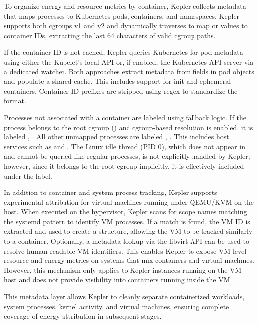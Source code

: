 To organize energy and resource metrics by container, Kepler collects metadata that maps processes to Kubernetes pods, containers, and namespaces. Kepler supports both cgroups v1 and v2 and dynamically traverses  to map  or  values to container IDs, extracting the last 64 characters of valid cgroup paths.

If the container ID is not cached, Kepler queries Kubernetes for pod metadata using either the Kubelet's local  API or, if enabled, the Kubernetes API server via a dedicated watcher. Both approaches extract metadata from  fields in pod objects and populate a shared cache. This includes support for init and ephemeral containers. Container ID prefixes are stripped using regex to standardize the format.

Processes not associated with a container are labeled using fallback logic. If the process belongs to the root cgroup () and cgroup-based resolution is enabled, it is labeled , . All other unmapped processes are labeled , . This includes host services such as  and . The Linux idle thread (PID 0), which does not appear in  and cannot be queried like regular processes, is not explicitly handled by Kepler; however, since it belongs to the root cgroup implicitly, it is effectively included under the  label.

In addition to container and system process tracking, Kepler supports experimental attribution for virtual machines running under QEMU/KVM on the host. When executed on the hypervisor, Kepler scans  for scope names matching the systemd pattern  to identify VM processes. If a match is found, the VM ID is extracted and used to create a  structure, allowing the VM to be tracked similarly to a container. Optionally, a metadata lookup via the libvirt API can be used to resolve human-readable VM identifiers. This enables Kepler to expose VM-level resource and energy metrics on systems that mix containers and virtual machines. However, this mechanism only applies to Kepler instances running on the VM host and does not provide visibility into containers running inside the VM.

This metadata layer allows Kepler to cleanly separate containerized workloads, system processes, kernel activity, and virtual machines, ensuring complete coverage of energy attribution in subsequent stages.

